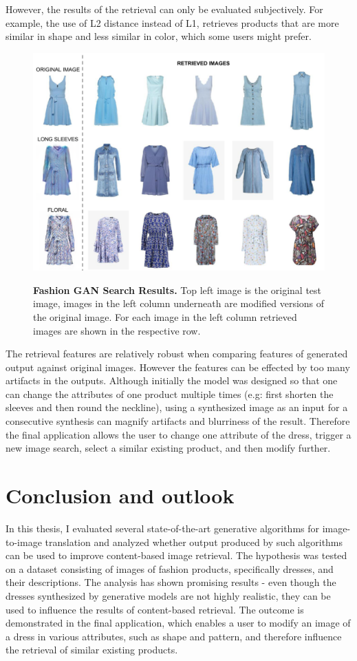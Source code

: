 \documentclass[12pt]{report}
\begin{document}
However, the results of the retrieval can only be evaluated subjectively. For example, the use of L2 distance instead of L1, retrieves products that are more similar in shape and less similar in color, which some users might prefer.

\begin{figure}[h]
\centering
{\includegraphics[width=.8\linewidth]{05_results/gan_search}}
\caption{\label{fig:pipeline_images} \textbf{Fashion GAN Search Results.} Top left image is the original test image, images in the left column underneath are modified versions of the original image. For each image in the left column retrieved images are shown in the respective row.}
\end{figure}

The retrieval features are relatively robust when comparing features of generated output against original images. However the features can be effected by too many artifacts in the outputs.  Although initially the model was designed so that one can change the attributes of one product multiple times (e.g: first shorten the sleeves and then round the neckline), using a synthesized image as an input for a consecutive synthesis can magnify artifacts and blurriness of the result. Therefore the final application allows the user to change one attribute of the dress, trigger a new image search, select a similar existing product, and then modify further.



\chapter{Conclusion and outlook}
In this thesis, I evaluated several state-of-the-art generative algorithms for image-to-image translation and analyzed whether output produced by such algorithms can be used to improve content-based image retrieval. The hypothesis was tested on a dataset consisting of images of fashion products, specifically dresses, and their descriptions. The analysis has shown promising results - even though the dresses synthesized by generative models are not highly realistic, they can be used to influence the results of content-based retrieval. The outcome is demonstrated in the final application, which enables a user to modify an image of a dress in various attributes, such as shape and pattern, and therefore influence the retrieval of similar existing products.
\end{document}
